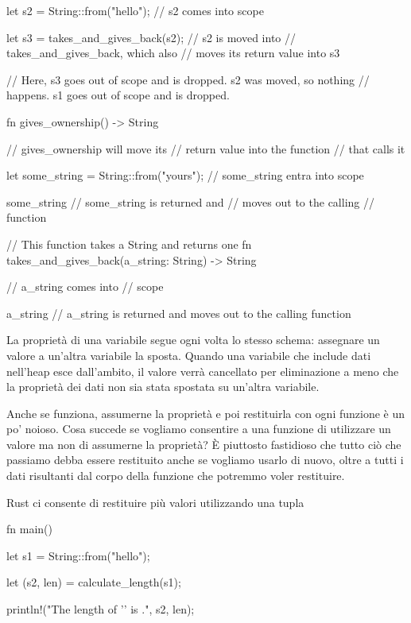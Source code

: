 \documentclass[11pt,a4paper]{article}
\begin{document}
{\begin{rust}
{    let s2 = String::from("hello"); // s2 comes into scope

    let s3 = takes_and_gives_back(s2);  // s2 is moved into
                                        // takes_and_gives_back, which also
                                        // moves its return value into s3
} // Here, s3 goes out of scope and is dropped. s2 was moved, so nothing
  // happens. s1 goes out of scope and is dropped.

fn gives_ownership() -> String {   // gives_ownership will move its
                                   // return value into the function
                                   // that calls it

    let some_string = String::from("yours"); // some_string entra into scope

    some_string                    // some_string is returned and
                                   // moves out to the calling
                                   // function
}

// This function takes a String and returns one
fn takes_and_gives_back(a_string: String) -> String { // a_string comes into
                                                      // scope

    a_string  // a_string is returned and moves out to the calling function
}
\end{rust}

La proprietà di una variabile segue ogni volta lo stesso schema: assegnare un valore a un'altra variabile la sposta. Quando una variabile che include dati nell'heap esce dall'ambito, il valore verrà cancellato per eliminazione a meno che la proprietà dei dati non sia stata spostata su un'altra variabile.

Anche se funziona, assumerne la proprietà e poi restituirla con ogni funzione è un po' noioso. Cosa succede se vogliamo consentire a una funzione di utilizzare un valore ma non di assumerne la proprietà? È piuttosto fastidioso che tutto ciò che passiamo debba essere restituito anche se vogliamo usarlo di nuovo, oltre a tutti i dati risultanti dal corpo della funzione che potremmo voler restituire.

Rust ci consente di restituire più valori utilizzando una tupla
\begin{rust}
fn main() {
    let s1 = String::from("hello");

    let (s2, len) = calculate_length(s1);

    println!("The length of '{}' is {}.", s2, len);
}


\end{rust}}
\end{document}
